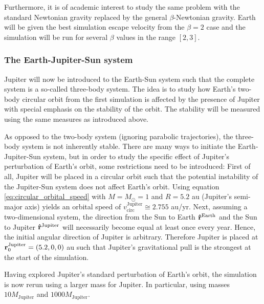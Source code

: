 \documentclass[reprint,english]{revtex4-1}
\begin{document}
Furthermore, it is of academic interest to study the same problem with the standard Newtonian gravity replaced by the general \(\beta\)-Newtonian gravity. Earth will be given the best simulation escape velocity from the \(\beta=2\) case and the simulation will be run for several \(\beta\) values in the range \([2,3]\).
\subsubsection{The Earth-Jupiter-Sun system}
Jupiter will now be introduced to the Earth-Sun system such that the complete system is a so-called three-body system. The idea is to study how Earth's two-body circular orbit from the first simulation is affected by the presence of Jupiter with special emphasis on the stability of the orbit. The stability will be measured using the same measures as introduced above.

As opposed to the two-body system (ignoring parabolic trajectories), the three-body system is not inherently stable. There are many ways to initiate the Earth-Jupiter-Sun system, but in order to study the specific effect of Jupiter's perturbation of Earth's orbit, some restrictions need to be introduced: First of all, Jupiter will be placed in a circular orbit such that the potential instability of the Jupiter-Sun system does not affect Earth's orbit. Using equation \eqref{eq:circular_orbital_speed} with \(M=M_\odot=1\) and \(R=5.2\) au (Jupiter's semi-major axis) yields an orbital speed of \(v_\text{circ}^\text{Jupiter}\cong2.755\) au/yr. Next, assuming a two-dimensional system, the direction from the Sun to Earth \(\vu{r}^\text{Earth}\) and the Sun to Jupiter \(\vu{r}^\text{Jupiter}\) will necessarily become equal at least once every year. Hence, the initial angular direction of Jupiter is arbitrary. Therefore Jupiter is placed at \(\vb{r}_0^\text{Jupiter}=(5.2,0,0)\) au such that Jupiter's gravitational pull is the strongest at the start of the simulation.

Having explored Jupiter's standard perturbation of Earth's orbit, the simulation is now rerun using a larger mass for Jupiter. In particular, using masses \(10M_\text{Jupiter}\) and \(1000M_\text{Jupiter}\).
\end{document}

